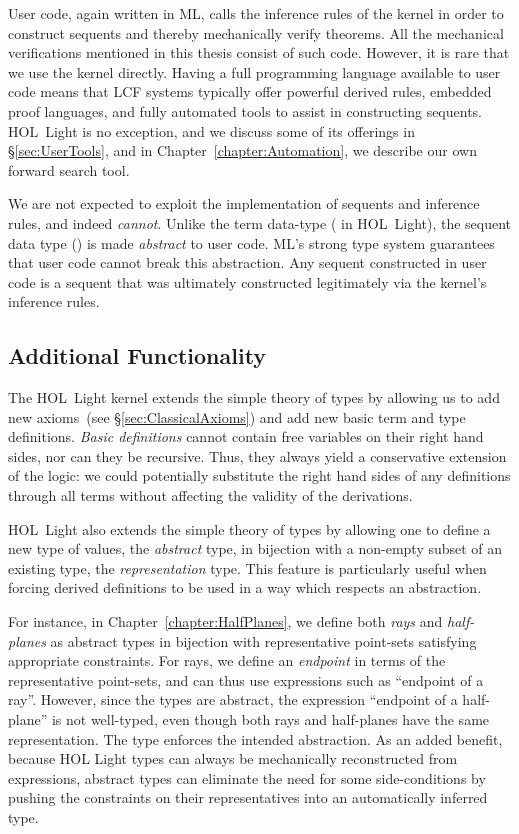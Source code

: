 User code, again written in ML, calls the inference rules of the kernel in order to construct sequents and thereby mechanically verify theorems. All the mechanical verifications mentioned in this thesis consist of such code. However, it is rare that we use the kernel directly. Having a full programming language available to user code means that LCF systems typically offer powerful derived rules, embedded proof languages, and fully automated tools to assist in constructing sequents. HOL~Light is no exception, and we discuss some of its offerings in \S\ref{sec:UserTools}, and in Chapter~\ref{chapter:Automation}, we describe our own forward search tool.

We are not expected to exploit the implementation of sequents and inference rules, and indeed \emph{cannot}. Unlike the term data-type ( in HOL~Light), the sequent data type () is made \emph{abstract} to user code. ML's strong type system guarantees that user code cannot break this abstraction. Any sequent constructed in user code is a sequent that was ultimately constructed legitimately via the kernel's inference rules.

\subsection{Additional Functionality}
The HOL~Light kernel extends the simple theory of types by allowing us to add new axioms~(see \S\ref{sec:ClassicalAxioms}) and add new basic term and type definitions. \emph{Basic definitions} cannot contain free variables on their right hand sides, nor can they be recursive. Thus, they always yield a conservative extension of the logic: we could potentially substitute the right hand sides of any definitions through all terms without affecting the validity of the derivations.

HOL~Light also extends the simple theory of types by allowing one to define a new type of values, the \emph{abstract} type, in bijection with a non-empty subset of an existing type, the \emph{representation} type. This feature is particularly useful when forcing derived definitions to be used in a way which respects an abstraction.

For instance, in Chapter~\ref{chapter:HalfPlanes}, we define both \emph{rays} and \emph{half-planes} as abstract types in bijection with representative point-sets satisfying appropriate constraints. For rays, we define an \emph{endpoint} in terms of the representative point-sets, and can thus use expressions such as ``endpoint of a ray''. However, since the types are abstract, the expression ``endpoint of a half-plane'' is not well-typed, even though both rays and half-planes have the same representation. The type  enforces the intended abstraction. As an added benefit, because HOL Light types can always be mechanically reconstructed from expressions, abstract types can eliminate the need for some side-conditions by pushing the constraints on their representatives into an automatically inferred type.

